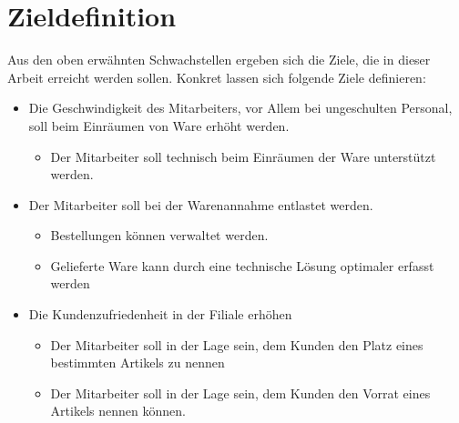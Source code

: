 \section{Zieldefinition}
\label{sec:zieldefinition}
Aus den oben erwähnten Schwachstellen ergeben sich die Ziele, die in dieser Arbeit erreicht werden sollen. Konkret lassen sich folgende Ziele definieren:
\begin{itemize}
	\item Die Geschwindigkeit des Mitarbeiters, vor Allem bei ungeschulten Personal, soll beim Einräumen von Ware erhöht werden.
	\begin{itemize}
		\item Der Mitarbeiter soll technisch beim Einräumen der Ware unterstützt werden.
	\end{itemize}
	\item Der Mitarbeiter soll bei der Warenannahme entlastet werden.
	\begin{itemize}
		\item Bestellungen können verwaltet werden.
		\item Gelieferte Ware kann durch eine technische Lösung optimaler erfasst werden
	\end{itemize}
	\item Die Kundenzufriedenheit in der Filiale erhöhen
	\begin{itemize}
		\item Der Mitarbeiter soll in der Lage sein, dem Kunden den Platz eines bestimmten Artikels zu nennen
		\item Der Mitarbeiter soll in der Lage sein, dem Kunden den Vorrat eines Artikels nennen können. 
	\end{itemize}
\end{itemize}
